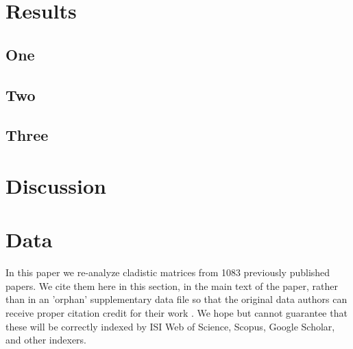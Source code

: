 \documentclass[fleqn,10pt]{wlpeerj}
\begin{document}
\section{Results}

\subsection{One}

\subsection{Two}

\subsection{Three}

\section{Discussion}


\section{Data}
In this paper we re-analyze cladistic matrices from 1083 previously published papers. We cite them here in this section, in the main text of the paper, rather than in an 'orphan' supplementary data file so that the original data authors can receive proper citation credit for their work \cite{Kueffer2011}. We hope but cannot guarantee that these will be correctly indexed by ISI Web of Science, Scopus, Google Scholar, and other indexers.
\end{document}
